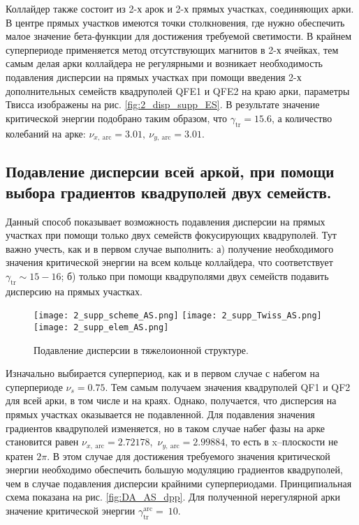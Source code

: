 \par Коллайдер также состоит из 2-х арок и 2-х прямых участках, соединяющих арки. В центре прямых участков имеются точки столкновения, где нужно обеспечить малое значение бета-функции для достижения требуемой светимости. В крайнем суперпериоде применяется метод отсутствующих магнитов в 2-х ячейках, тем самым делая арки коллайдера не регулярными и возникает необходимость подавления дисперсии на прямых участках при помощи введения 2-х дополнительных семейств квадруполей QFE1 и QFE2 на краю арки, параметры Твисса изображены на рис. \ref{fig:2_disp_supp_ES}. В результате значение критической энергии подобрано таким образом, что $\gamma_{\text{tr}}=15.6$, а количество колебаний на арке: $\nu_{x,\ \text{arc}}=3.01,\ \nu_{y,\ \text{arc}}=3.01$.

\subsection{Подавление дисперсии всей аркой, при помощи выбора градиентов квадруполей двух семейств.}\label{subsec:transition_variation/methods/disp_supperssion_AS}	

Данный способ показывает возможность подавления дисперсии на прямых участках при помощи только двух семейств фокусирующих квадруполей. Тут важно учесть, как и в первом случае выполнить:
	а) получение необходимого значения критической энергии на всем кольце коллайдера, что соответствует $\gamma_{\text{tr}}\sim15-16$;
	б) только при помощи квадруполями двух семейств подавить дисперсию на прямых участках.

\begin{figure} [h!]
	\center
	\texttt{[image: 2\_supp\_scheme\_AS.png]}
	\texttt{[image: 2\_supp\_Twiss\_AS.png]}
	\texttt{[image: 2\_supp\_elem\_AS.png]}
	\caption{Подавление дисперсии в тяжелоионной структуре.}
	\label{fig:2_disp_supp_AS}
\end{figure}
	
\par Изначально выбирается суперпериод, как и в первом случае с набегом на суперпериоде $\nu_s=0.75$. Тем самым получаем значения квадруполей QF1 и QF2 для всей арки, в том числе и на краях. Однако, получается, что дисперсия на прямых участках оказывается не подавленной. Для подавления значения градиентов квадруполей изменяется, но в таком случае набег фазы на арке становится равен $\nu_{x,\ \text{arc}}=2.72178$,\ $\nu_{y,\ \text{arc}}=2.99884$, то есть в x–плоскости не кратен $2\pi$. В этом случае для достижения требуемого значения критической энергии необходимо обеспечить большую модуляцию градиентов квадруполей, чем в случае подавления дисперсии крайними суперпериодами. Принципиальная схема показана на рис. \ref{fig:DA_AS_dpp}. Для полученной нерегулярной арки значение критической энергии $\gamma_{\text{tr}}^{\text{arc}}=\ 10$.

